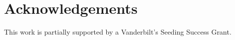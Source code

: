 \documentclass[a4paper, amsfonts, amssymb, amsmath, reprint, showkeys, nofootinbib, twoside,notitlepage,onecolumn]{revtex4-2}
\theoremstyle{definition}
\theoremstyle{theorem}
\theoremstyle{corollary}
\begin{document}




\section*{Acknowledgements}

This work is partially supported by a Vanderbilt's Seeding Success Grant.




\end{document}
